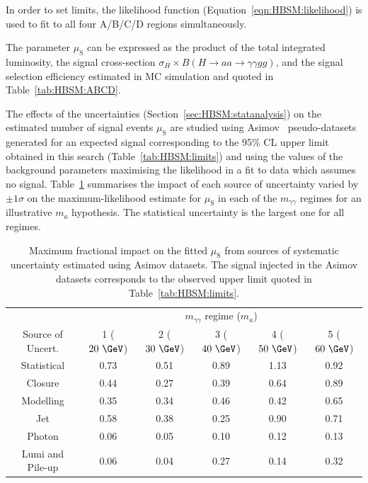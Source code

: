 In order to set limits, the likelihood function (Equation~\ref{eqn:HBSM:likelihood}) is used to fit to all four A/B/C/D regions simultaneously.

The parameter $\mu_\text{S}$ can be expressed as the product of the total integrated luminosity, the signal cross-section 
$\sigma_H\times B(H\to aa\to \gamma\gamma gg)$, and the signal selection efficiency estimated in MC simulation and quoted in Table~\ref{tab:HBSM:ABCD}.

The effects of the uncertainties (Section~\ref{sec:HBSM:statanalysis}) on the estimated number of signal events $\mu_\text{S}$ are studied using Asimov~\cite{Cowan:2010js} pseudo-datasets generated
for an expected signal corresponding to the 95\% CL upper limit obtained in this search (Table~\ref{tab:HBSM:limits}) and using the values of the background 
parameters maximising the likelihood in a fit to data which assumes no signal.
Table~\ref{tab:HBSM:systs} summarises the impact of each source of uncertainty varied by $\pm1\sigma$ on the maximum-likelihood estimate for $\mu_\text{S}$ in each 
of the $m_{\gamma\gamma}$ regimes for an illustrative $m_a$ hypothesis. The statistical uncertainty is the largest one for all regimes.
\begin{table}[t]
  \begin{center}
    \caption{
      Maximum fractional impact on the fitted $\mu_\text{S}$ from sources of systematic uncertainty estimated using Asimov datasets.
      The signal injected in the Asimov datasets corresponds to the observed upper limit quoted in Table~\ref{tab:HBSM:limits}.
    }
    \label{tab:HBSM:systs}
          {\footnotesize
	  \begin{tabular}{cccccc}
	  \hline
          &\multicolumn{5}{c}{$m_{\gamma\gamma}$ regime ($m_a$)} \\
          Source of Uncert.   &    1 ($20~\GeV$)  &   2 ($30~\GeV$)  &   3 ($40~\GeV$)  &   4 ($50~\GeV$)  &   5 ($60~\GeV$)  \\
          \hline
	  Statistical          &     0.73 &     0.51 &     0.89 &     1.13 &     0.92 \\
	  Closure              &     0.44 &     0.27 &     0.39 &     0.64 &     0.89 \\
	  \hline
	  Modelling            &     0.35 &     0.34 &     0.46 &     0.42 &     0.65 \\
	  Jet                  &     0.58 &     0.38 &     0.25 &     0.90 &     0.71 \\
	  Photon               &     0.06 &     0.05 &     0.10 &     0.12 &     0.13 \\
	  Lumi and Pile-up     &     0.06 &     0.04 &     0.27 &     0.14 &     0.32 \\
	  \hline
	  \end{tabular}
          }
  \end{center}
\end{table}

